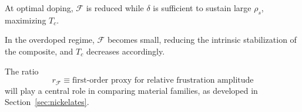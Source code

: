     At optimal doping,
    $\mathcal{F}$ is reduced
    while $\delta$ is sufficient
    to sustain large $\rho_s$,
    maximizing $T_c$.

    In the overdoped regime,
    $\mathcal{F}$ becomes small,
    reducing the intrinsic stabilization
    of the composite,
    and $T_c$ decreases accordingly.

    The ratio
    \begin{equation}
      r_{\mathcal{F}}
      \equiv
      \text{first-order proxy for relative frustration amplitude}
    \end{equation}
    will play a central role
    in comparing material families,
    as developed in Section~\ref{sec:nickelates}.
